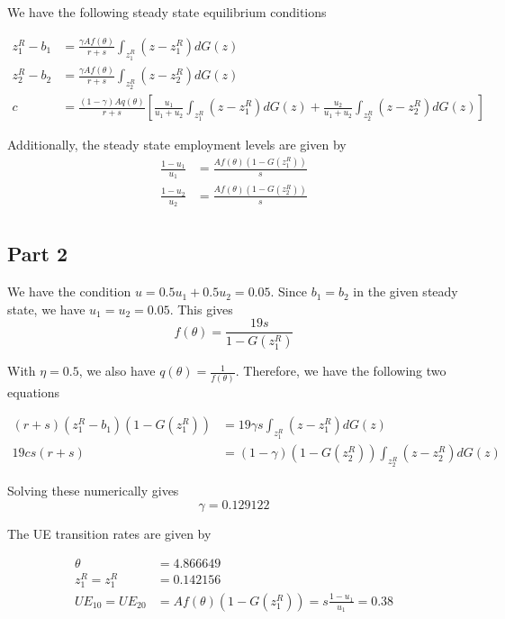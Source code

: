 We have the following steady state equilibrium conditions

\begin{align}
    z^R_1 - b_1 &= \frac{\gamma A f(\theta)}{r+s} \int_{z^R_1} (z-z^R_1 ) dG(z)\label{eq:q2_ss_zr1}\\
    z^R_2 - b_2 &= \frac{\gamma A f(\theta)}{r+s} \int_{z^R_2} (z-z^R_2 ) dG(z)\label{eq:q2_ss_zr2}\\
    c &= \frac{(1-\gamma) A q(\theta)}{r+s}\left[ \frac{u_1}{u_1 + u_2}\int_{z^R_1} (z-z^R_1 ) dG(z)  + \frac{u_2}{u_1 + u_2}\int_{z^R_2} (z-z^R_2 ) dG(z) \right]\label{eq:q2_ss_c}
\end{align}

Additionally, the steady state employment levels are given by 
\begin{align}
    \frac{1-u_1}{u_1} &= \frac{Af(\theta)(1-G(z_1^R))}{s}\label{eq:q2_ss_u1}\\
    \frac{1-u_2}{u_2} &= \frac{Af(\theta)(1-G(z_2^R))}{s}\label{eq:q2_ss_u2}\\
\end{align}

\subsection*{Part 2}

We have the condition $u=  0.5 u_1 + 0.5u_2 = 0.05$. Since $b_1 = b_2$ in the given steady state, we have $u_1 = u_2 = 0.05$. This gives 
\begin{equation}
    f(\theta) = \frac{19s}{1-G(z_1^R)}
\end{equation}

With $\eta = 0.5$, we also have $q(\theta) = \frac{1}{f(\theta)}$. Therefore, we have the following two equations

\begin{align*}
    (r+s)(z^R_1 - b_1)(1-G(z_1^R)) &= 19 \gamma s \int_{z^R_1} (z-z^R_1 ) dG(z)\\
    19 cs (r+s) &= (1-\gamma)(1-G(z_2^R))\int_{z^R_2} (z-z^R_2 ) dG(z)
\end{align*}

Solving these numerically gives $$\gamma = 0.129122$$

The UE transition rates are given by 

\begin{align*}
    \theta &= 4.866649 \\ 
    z^R_1 = z^R_1 &= 0.142156\\
    UE_{10} = UE_{20}&= A f(\theta) (1-G(z_1^R)) = s \frac{1-u_1}{u_1} = 0.38
\end{align*}

